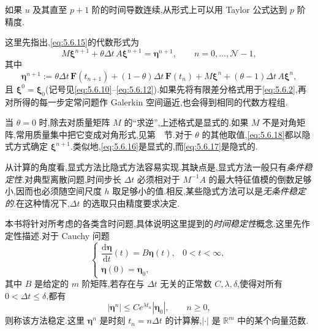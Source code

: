 如果 \(u\) 及其直至 \(p+1\) 阶的时间导数连续,从形式上可以用 Taylor 公式达到 \(p\) 阶精度.

这里先指出,\eqref{eq:5.6.15}的代数形式为
\begin{equation}\label{eq:5.6.18}
  M\boldsymbol{\xi}^{n+1}+\theta\Delta t\,A\boldsymbol{\xi}^{n+1}=\boldsymbol{\eta}^{n+1},
    \qquad n=0,\ldots,\mathcal N-1,
\end{equation}
其中
\[
  \boldsymbol{\eta}^{n+1}:=\theta\Delta t\,\boldsymbol{F}(t_{n+1})
    +(1-\theta)\Delta t\,\boldsymbol{F}(t_n)
    +M\boldsymbol{\xi}^n+(\theta-1)\Delta t\,A\boldsymbol{\xi}^n,
\]
且 \(\boldsymbol{\xi}^0=\boldsymbol{\xi}_0\)(记号见\eqref{eq:5.6.10}–\eqref{eq:5.6.12}).如果先将有限差分格式用于\eqref{eq:5.6.2},再对所得的每一步定常问题作 Galerkin 空间逼近,也会得到相同的代数方程组.

当 \(\theta=0\) 时,除去对质量矩阵 \(M\) 的“求逆”,上述格式是显式的.如果 \(M\) 不是对角矩阵,常用质量集中把它变成对角形式,见第~~节.对于 \(\theta\) 的其他取值,\eqref{eq:5.6.18}都以隐式方式确定 \(\boldsymbol{\xi}^{n+1}\).类似地,\eqref{eq:5.6.16}是显式的,而\eqref{eq:5.6.17}是隐式的.

从计算的角度看,显式方法比隐式方法容易实现.其缺点是,显式方法一般只有\emph{条件稳定性}.对典型离散问题,时间步长 \(\Delta t\) 必须相对于 \(M^{-1}A\) 的最大特征值模的倒数足够小,因而也必须随空间尺度 \(h\) 取足够小的值.相反,某些隐式方法可以是\emph{无条件稳定的}.在这种情况下,\(\Delta t\) 的选取只由精度要求决定.

本书将针对所考虑的各类含时问题,具体说明这里提到的\emph{时间稳定性}概念.这里先作定性描述.对于 Cauchy 问题
\begin{equation}\label{eq:5.6.19}
  \begin{cases}
    \dfrac{\mathrm d\boldsymbol{\eta}}{\mathrm dt}(t)=B\boldsymbol{\eta}(t),
      &0<t<\infty,\\
    \boldsymbol{\eta}(0)=\boldsymbol{\eta}_0,
  \end{cases}
\end{equation}
其中 \(B\) 是给定的 \(m\) 阶矩阵,若存在与 \(\Delta t\) 无关的正常数 \(C,\lambda,\delta\),使得对所有 \(0<\Delta t\le\delta\),都有
\begin{equation}\label{eq:5.6.20}
  |\boldsymbol{\eta}^n|\le Ce^{\lambda t_n}|\boldsymbol{\eta}_0|,\qquad n\ge0,
\end{equation}
则称该方法稳定.这里 \(\boldsymbol{\eta}^n\) 是时刻 \(t_n=n\Delta t\) 的计算解,\(|\cdot|\) 是 \(\mathbb R^m\) 中的某个向量范数.

